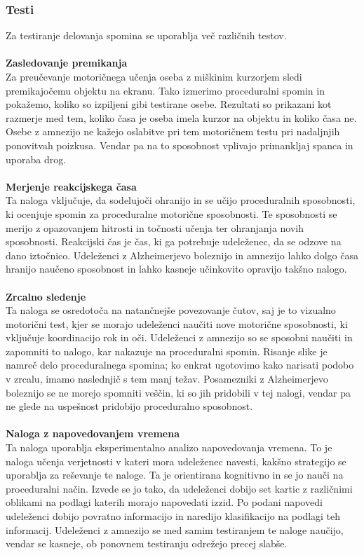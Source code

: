 \documentclass[10pt,a4paper]{article}
\begin{document}
\subsubsection{Testi}
Za testiranje delovanja spomina se uporablja več različnih testov.
\\
\\
\textbf{Zasledovanje premikanja}\\
Za preučevanje motoričnega učenja oseba z miškinim kurzorjem sledi premikajočemu objektu na ekranu. Tako izmerimo proceduralni spomin in pokažemo, koliko so izpiljeni gibi testirane osebe. Rezultati so prikazani kot razmerje med tem, koliko časa je oseba imela kurzor na objektu in koliko časa ne. Osebe z amnezijo ne kažejo oslabitve pri tem motoričnem testu pri nadaljnjih ponovitvah poizkusa. Vendar pa na to sposobnost vplivajo primankljaj spanca in uporaba drog.
\\
\\
\textbf{Merjenje reakcijskega časa}\\
Ta naloga vključuje, da sodelujoči ohranijo in se učijo proceduralnih sposobnosti, ki ocenjuje spomin za proceduralne motorične sposobnosti. Te sposobnosti se merijo z opazovanjem hitrosti in točnosti učenja ter ohranjanja novih sposobnosti. Reakcijski čas je čas, ki ga potrebuje udeleženec, da se odzove na dano iztočnico. Udeleženci z Alzheimerjevo boleznijo in amnezijo lahko dolgo časa hranijo naučeno sposobnost in lahko kasneje učinkovito opravijo takšno nalogo.
\\
\\
\textbf{Zrcalno sledenje}\\
Ta naloga se osredotoča na natančnejše povezovanje čutov, saj je to vizualno motorični test, kjer se morajo udeleženci naučiti nove motorične sposobnosti, ki vključuje koordinacijo rok in oči. Udeleženci z amnezijo so se sposobni naučiti in zapomniti to nalogo, kar nakazuje na proceduralni spomin. Risanje slike je namreč delo proceduralnega spomina; ko enkrat ugotovimo kako narisati podobo v zrcalu, imamo naslednjič s tem manj težav. Posamezniki z Alzheimerjevo boleznijo se ne morejo spomniti veščin, ki so jih pridobili v tej nalogi, vendar pa ne glede na uspešnost pridobijo proceduralno sposobnost.
\\
\\
\textbf{Naloga z napovedovanjem vremena}\\
Ta naloga uporablja eksperimentalno analizo napovedovanja vremena. To je naloga učenja verjetnosti v kateri mora udeleženec navesti, kakšno strategijo se uporablja za reševanje te naloge. Ta je orientirana kognitivno in se jo nauči na proceduralni način. Izvede se jo tako, da udeleženci dobijo set kartic z različnimi oblikami na podlagi katerih morajo napovedati izzid. Po podani napovedi udeleženci dobijo povratno informacijo in naredijo klasifikacijo na podlagi teh informacij. Udeleženci z amnezijo se med samim testiranjem te naloge naučijo, vendar se kasneje, ob ponovnem testiranju odrežejo precej slabše.
\end{document}
